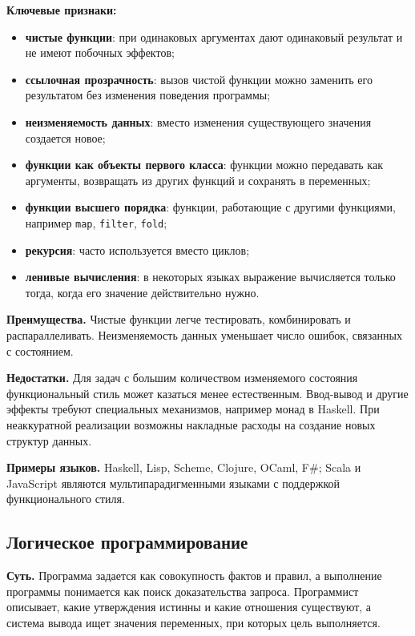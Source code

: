 \textbf{Ключевые признаки:}
\begin{itemize}
    \item \textbf{чистые функции}: при одинаковых аргументах дают одинаковый результат и не имеют побочных эффектов;
    \item \textbf{ссылочная прозрачность}: вызов чистой функции можно заменить его результатом без изменения поведения программы;
    \item \textbf{неизменяемость данных}: вместо изменения существующего значения создается новое;
    \item \textbf{функции как объекты первого класса}: функции можно передавать как аргументы, возвращать из других функций и сохранять в переменных;
    \item \textbf{функции высшего порядка}: функции, работающие с другими функциями, например \texttt{map}, \texttt{filter}, \texttt{fold};
    \item \textbf{рекурсия}: часто используется вместо циклов;
    \item \textbf{ленивые вычисления}: в некоторых языках выражение вычисляется только тогда, когда его значение действительно нужно.
\end{itemize}

\textbf{Преимущества.} Чистые функции легче тестировать, комбинировать и распараллеливать. Неизменяемость данных уменьшает число ошибок, связанных с состоянием.

\textbf{Недостатки.} Для задач с большим количеством изменяемого состояния функциональный стиль может казаться менее естественным. Ввод-вывод и другие эффекты требуют специальных механизмов, например монад в Haskell. При неаккуратной реализации возможны накладные расходы на создание новых структур данных.

\textbf{Примеры языков.} Haskell, Lisp, Scheme, Clojure, OCaml, F\#; Scala и JavaScript являются мультипарадигменными языками с поддержкой функционального стиля.

\subsection*{Логическое программирование}

\textbf{Суть.} Программа задается как совокупность фактов и правил, а выполнение программы понимается как поиск доказательства запроса. Программист описывает, какие утверждения истинны и какие отношения существуют, а система вывода ищет значения переменных, при которых цель выполняется.

